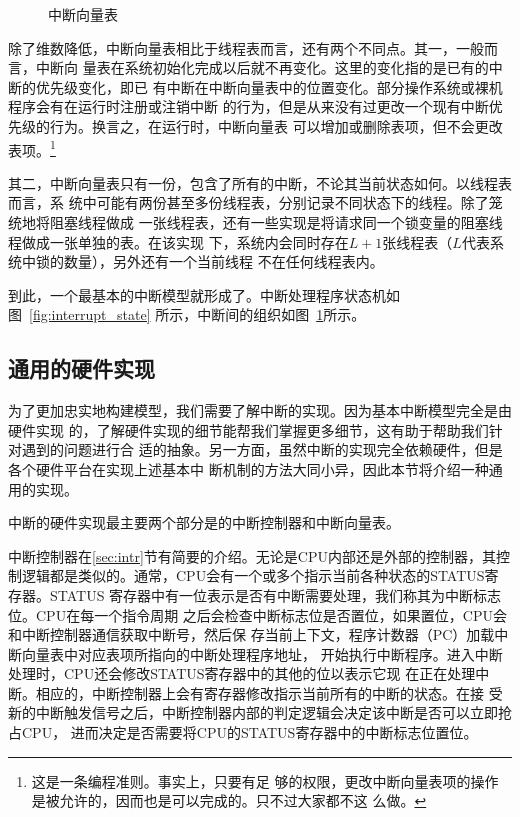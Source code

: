 \begin{figure}[H]
	\centering
	
	\caption{中断向量表}
	\label{fig:interrupt_vector_table}
\end{figure}

除了维数降低，中断向量表相比于线程表而言，还有两个不同点。其一，一般而言，中断向
量表在系统初始化完成以后就不再变化。这里的变化指的是已有的中断的优先级变化，即已
有中断在中断向量表中的位置变化。部分操作系统或裸机程序会有在运行时注册或注销中断
的行为，但是从来没有过更改一个现有中断优先级的行为。换言之，在运行时，中断向量表
可以增加或删除表项，但不会更改表项。\footnote{这是一条编程准则。事实上，只要有足
够的权限，更改中断向量表项的操作是被允许的，因而也是可以完成的。只不过大家都不这
么做。}

其二，中断向量表只有一份，包含了所有的中断，不论其当前状态如何。以线程表而言，系
统中可能有两份甚至多份线程表，分别记录不同状态下的线程。除了笼统地将阻塞线程做成
一张线程表，还有一些实现是将请求同一个锁变量的阻塞线程做成一张单独的表。在该实现
下，系统内会同时存在$L+1$张线程表（$L$代表系统中锁的数量），另外还有一个当前线程
不在任何线程表内。

到此，一个最基本的中断模型就形成了。中断处理程序状态机如图~\ref{fig:interrupt_state}
所示，中断间的组织如图~\ref{fig:interrupt_vector_table}所示。

\subsection{通用的硬件实现}
\label{subsec:basic_hardware}

为了更加忠实地构建模型，我们需要了解中断的实现。因为基本中断模型完全是由硬件实现
的，了解硬件实现的细节能帮我们掌握更多细节，这有助于帮助我们针对遇到的问题进行合
适的抽象。另一方面，虽然中断的实现完全依赖硬件，但是各个硬件平台在实现上述基本中
断机制的方法大同小异，因此本节将介绍一种通用的实现。

中断的硬件实现最主要两个部分是的中断控制器和中断向量表。

中断控制器在\ref{sec:intr}节有简要的介绍。无论是CPU内部还是外部的控制器，其控
制逻辑都是类似的。通常，CPU会有一个或多个指示当前各种状态的STATUS寄存器。STATUS
寄存器中有一位表示是否有中断需要处理，我们称其为中断标志位。CPU在每一个指令周期
之后会检查中断标志位是否置位，如果置位，CPU会和中断控制器通信获取中断号，然后保
存当前上下文，程序计数器（PC）加载中断向量表中对应表项所指向的中断处理程序地址，
开始执行中断程序。进入中断处理时，CPU还会修改STATUS寄存器中的其他的位以表示它现
在正在处理中断。相应的，中断控制器上会有寄存器修改指示当前所有的中断的状态。在接
受新的中断触发信号之后，中断控制器内部的判定逻辑会决定该中断是否可以立即抢占CPU，
进而决定是否需要将CPU的STATUS寄存器中的中断标志位置位。

